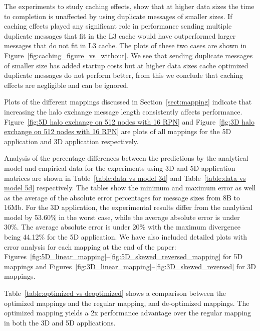 \documentclass{acm_proc_article-sp}
\begin{document}
The experiments to study caching effects, show that at higher data sizes the time to completion
is unaffected by using duplicate messages of smaller sizes. If caching effects played any significant
role in performance sending multiple duplicate messages that fit in the L3 cache would have
outperformed larger messages that do not fit in L3 cache. The plots of these two cases are shown
in Figure~\ref{fig:caching_figure_vs_without}. We see that sending duplicate messages of smaller
size has added startup costs but at higher data sizes cache optimized  duplicate messages do not
perform better, from this we conclude that caching effects are negligible and can be ignored.

Plots of the different mappings discussed in Section~\ref{sect:mapping} indicate that increasing
the halo exchange message length consistently affects performance.
Figure~\ref{fig:5D halo exchange on 512 nodes with 16 RPN} and Figure~\ref{fig:3D halo exchange on 512 nodes with 16 RPN}
are plots of all mappings for the 5D application and 3D application respectively.

Analysis of the percentage differences between the predictions by the analytical model and empirical data
for the experiments using 3D and 5D application matrices are shown in Table~\ref{table:data vs model 3d}
and Table~\ref{table:data vs model 5d} respectively. The tables show the minimum and maximum error
as well as the average of the absolute error percentages for message sizes from 8B to 16Mb. For the
3D application, the experimental results differ from the analytical model by 53.60\% in the worst case,
while the average absolute error is under 30\%. The average absolute error is under 20\% with the
maximum divergence being 44.12\% for the 5D application.
We have also included detailed plots with error analysis for each mapping at the end
of the paper: Figures~\ref{fig:5D_linear_mapping}--\ref{fig:5D_skewed_reversed_mapping} for 5D mappings and 
Figures~\ref{fig:3D_linear_mapping}--\ref{fig:3D_skewed_reversed} for 3D mappings.

Table~\ref{table:optimized vs deoptimized} shows a comparison between the optimized mappings and the
regular mapping, and de-optimized mappings. The optimized mapping yields a 2x performance advantage
over the regular mapping in both the 3D and 5D applications.
\end{document}

